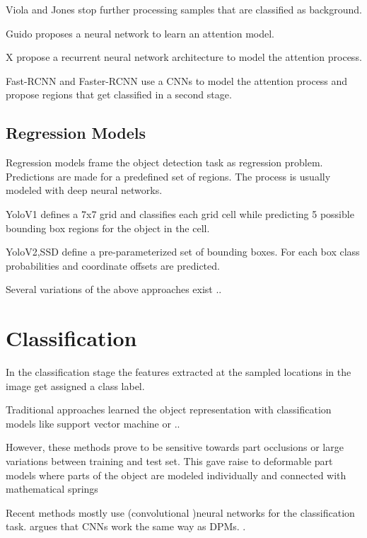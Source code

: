 	Viola and Jones stop further processing samples that are classified as background.
	
	Guido proposes a neural network to learn an attention model.
	
	X propose a recurrent neural network architecture to model the attention process.
	
	Fast-RCNN and Faster-RCNN use a \acp{CNN} to model the attention process and propose regions that get classified in a second stage.
	
	\subsection{Regression Models}
	
	Regression models frame the object detection task as regression problem. Predictions are made for a predefined set of regions. The process is usually modeled with deep neural networks.
	
	YoloV1 defines a 7x7 grid and classifies each grid cell while predicting 5 possible bounding box regions for the object in the cell.
	
	YoloV2,SSD define a pre-parameterized set of bounding boxes. For each box class probabilities and coordinate offsets are predicted. 
	
	Several variations of the above approaches exist ..
	
	\section{Classification}
	
	In the classification stage the features extracted at the sampled locations in the image get assigned a class label.
	
	Traditional approaches learned the object representation with classification models like support vector machine or ..
	
	However, these methods prove to be sensitive towards part occlusions or large variations between training and test set. This gave raise to deformable part models where parts of the object are modeled individually and connected with mathematical springs 
	
	Recent methods mostly use (convolutional )neural networks for the classification task.  argues that \acp{CNN} work the same way as DPMs.
	\cite{Viola2004}.

